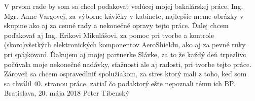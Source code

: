 \null
\vfill
\noindent

V prvom rade by som sa chcel poďakovať vedúcej mojej bakalárskej práce, Ing. Mgr. Anne Vargovej, za výborne kávičky v kabinete, najlepšie meme obrázky v skupine ako aj za cenné rady a nekonečné opravy tejto práce. Ďalej chcem poďakovať aj Ing. Erikovi Mikulášovi, za pomoc pri tvorbe a kontrole (skoro)všetkých elektronických komponentov AeroShieldu, ako aj za pevné ruky pri spájkovaní. Ďakujem aj mojej partnerke Slávke, za to že každý deň trpezlivo počúvala moje nekonečné nadávky, sťažnosti ale aj radosti, pri tvorbe tejto práce. Zároveň sa chcem ospravedlniť spolužiakom, za stres ktorý mali z toho, keď som sa chválil 40. stranou práce, zatiaľ čo podaktorý ešte nepoznali tému ich BP.\\

\noindent Bratislava, 20. mája 2018 \hfill  Peter Tibenský
\cleardoublepage


	

